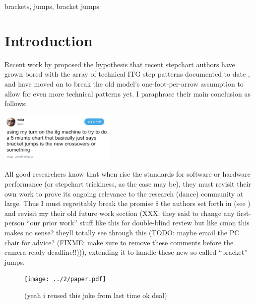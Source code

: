 \documentclass[10pt]{sigplanconf}
\begin{document}

\keywords
brackets, jumps, bracket jumps


\section{Introduction}

Recent work by \cite{dril}
proposed the hypothesis that
recent stepchart authors have grown bored with the array of technical ITG step patterns
documented to date \cite{turniness,crossoveriness},
and have moved on to break the old model's one-foot-per-arrow assumption to allow for even more technical patterns yet.
I paraphrase their main conclusion as follows:

\begin{center}
	\includegraphics[width=0.42\textwidth]{using-my-turn.png}
\end{center}

All good researchers know that when rise the standards for software or hardware performance
(or stepchart trickiness, as the case may be),
they must revisit their own work to prove its ongoing relevance to the research (dance) community at large.
Thus I must regrettably break the promise \sout{I} the authors set forth in \cite{crossoveriness}
(see )
and revisit \sout{my} their old future work section
(XXX: they said to change any first-person ``our prior work''
stuff like this for double-blind review but like cmon this makes no sense?
theyll totally see through this
(TODO: maybe email the PC chair for advice?
(FIXME: make sure to remove these comments before the camera-ready deadline!!))),
extending it to handle these new so-called ``bracket'' jumps.

\begin{figure}[h]
	\hspace{-2em}\texttt{[image: ../2/paper.pdf]}
	\caption{(yeah i reused this joke from last time ok deal)}
	\label{fig:you-stutid-fuckass}
\end{figure}

\end{document}
